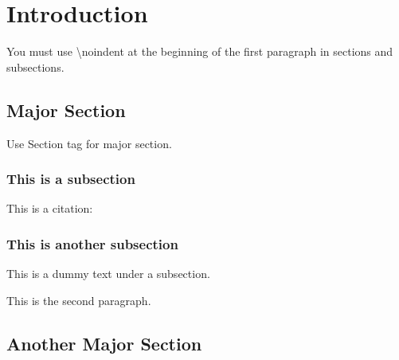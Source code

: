 \chapter{Introduction}\label{chap:introduction}
\noindent You must use \textbackslash{}noindent at the beginning of the first paragraph in sections and subsections.

\section{Major Section}
\noindent Use Section tag for major section.
    \subsection{This is a subsection}

\noindent This is a citation: \cite{iscac}
    \subsection{This is another subsection}
\noindent This is a dummy text under a subsection.\par
    This is the second paragraph.
\section{Another Major Section}
\newpage